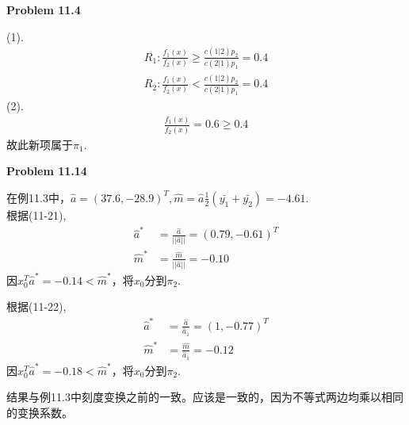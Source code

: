 \documentclass[UTF8,12pt]{article}
\newenvironment{problem}[2][Problem]
{ \begin{mdframed}[backgroundcolor=gray!20] \textbf{#1 #2}}
	{  \end{mdframed}}
\newenvironment{answer}
{%
}
{}
\newenvironment{eq}
{
	\begin{equation}
		\begin{aligned}\nonumber
}
{
		\end{aligned}
	\end{equation}
}
\begin{document}
\renewcommand{\qed}{\quad\qedsymbol}

\begin{problem}{11.4}
\end{problem}
\begin{answer}
    (1).
\begin{eq}
    R_1: \frac{f_1(x)}{f_2(x)}\ge 
    \frac{c(1|2)p_2}{c(2|1)p_1} = 0.4\\
    R_2: \frac{f_1(x)}{f_2(x)}<
    \frac{c(1|2)p_2}{c(2|1)p_1} = 0.4
\end{eq}(2).
\begin{eq}
        \frac{f_1(x)}{f_2(x)} = 0.6 \ge 0.4
    \end{eq}故此新项属于$\pi_1$.
\end{answer}

\begin{problem}{11.14}
\end{problem}
\begin{answer}
在例11.3中，$\hat{a}=(37.6, -28.9)^T, \hat{m} = \hat{a}\frac{1}{2}
(\bar{y_1}+\bar{y_2})=-4.61$.\\
根据(11-21),
\begin{eq}
    \hat{a}^* &= \frac{\hat{a}}{||\hat{a}||} = (0.79,-0.61)^T\\
    \hat{m}^* &= \frac{\hat{m}}{||\hat{a}||} = -0.10
\end{eq}因$x_0^T \hat{a}^* = -0.14 < \hat{m}^*$，将$x_0$分到$\pi_2$.

根据(11-22),
\begin{eq}
    \hat{a}^* &= \frac{\hat{a}}{\hat{a}_1} = (1,-0.77)^T\\
    \hat{m}^* &= \frac{\hat{m}}{\hat{a}_1} = -0.12
\end{eq}因$ x_0^T \hat{a}^* = -0.18 < \hat{m}^*$，将$x_0$分到$\pi_2$.

结果与例11.3中刻度变换之前的一致。应该是一致的，因为不等式两边均乘以相同的变换系数。
\end{answer}
\end{document}
